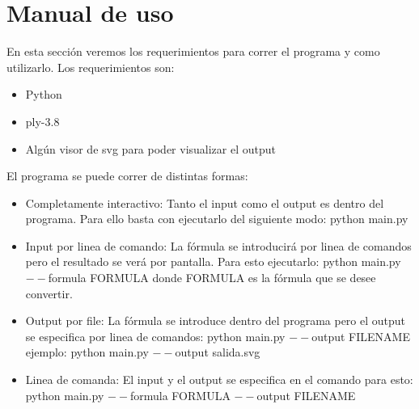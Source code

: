 \section{Manual de uso}
En esta sección veremos los requerimientos para correr el programa y como utilizarlo. Los requerimientos son:

\begin{itemize}
  \item Python
  \item ply-3.8
  \item Algún visor de svg para poder visualizar el output
\end{itemize}

El programa se puede correr de distintas formas:

\begin{itemize}
  \item Completamente interactivo: Tanto el input como el output es dentro del programa. Para ello basta con ejecutarlo del siguiente modo: python main.py
  \item Input por linea de comando: La fórmula se introducirá por linea de comandos pero el resultado se verá por pantalla. Para esto ejecutarlo: python main.py $--$formula FORMULA donde FORMULA es la fórmula que se desee convertir.
  \item Output por file: La fórmula se introduce dentro del programa pero el output se especifica por linea de comandos: python main.py $--$output FILENAME ejemplo: python main.py $--$output salida.svg
  \item Linea de comanda: El input y el output se especifica en el comando para esto: python main.py $--$formula FORMULA $--$output FILENAME
\end{itemize}
